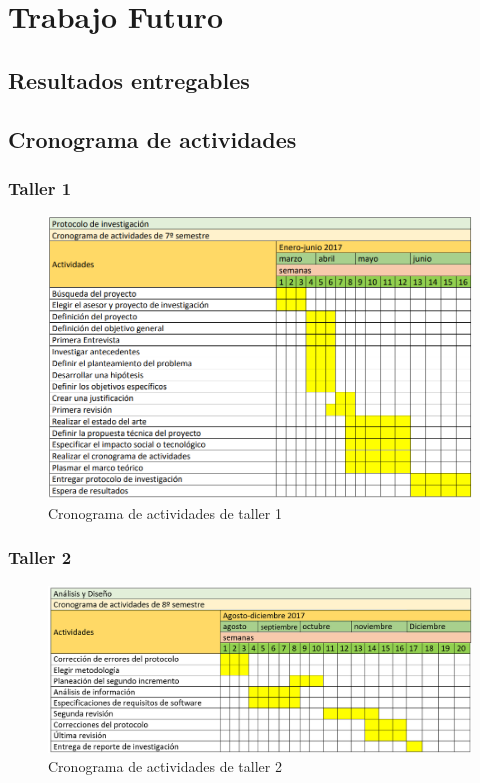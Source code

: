  \chapter{Trabajo Futuro}

 \section{Resultados entregables}


\section{Cronograma de actividades}
    \subsection{Taller 1}
    \begin{figure}[h]
      \centering
      \includegraphics[scale=.7]{lib/assets/cronograma-1}
      \caption{Cronograma de actividades de taller 1}
    \end{figure}

    \subsection{Taller 2}

    \begin{figure}[h]
      \centering
      \includegraphics[scale=.7]{lib/assets/cronogramataller2}
      \caption{Cronograma de actividades de taller 2}
    \end{figure}


